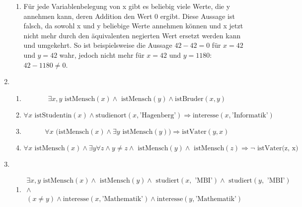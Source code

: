 \documentclass[a4paper]{article}
\begin{document}
\begin{enumerate}
\begin{enumerate}
			\item
			Für jede Variablenbelegung von x gibt es beliebig viele Werte, die y annehmen kann, deren Addition den Wert 0 ergibt.
			\newline
			Diese Aussage ist falsch, da sowohl x und y beliebige Werte annehmen können und x jetzt nicht mehr durch den äquivalenten negierten Wert ersetzt werden kann und umgekehrt.
			\newline
			So ist beispielsweise die Aussage $42 - 42 = 0$ für $x = 42$ und $y = 42$ wahr, jedoch nicht mehr für $x = 42$ und $y = 1180$: $42 - 1180 \neq 0$.
		\end{enumerate}
		
		\item
		\begin{enumerate}
			\item
			\begin{equation*}
				\exists x, y \text{ istMensch}(x) \land \text{ istMensch}(y) \land \text{istBruder}(x, y)
			\end{equation*}
			
			\item
			\begin{equation*}
				\forall x \text{ istStudentin}(x) \land \text{studienort}(x, \text{'Hagenberg'}) \Rightarrow \text{interesse}(x, \text{'Informatik'})
			\end{equation*}
			
			\item
			\begin{equation*}
				\forall x \text{ (istMensch}(x) \land \exists y \text{ istMensch}(y)) \Rightarrow \text{istVater}(y, x)
			\end{equation*}
			
			\item
			\begin{equation*}
				\forall x \text{ istMensch}(x) \land \exists y \forall z \land y \neq z \land \text{ istMensch}(y) \land \text{ istMensch}(z) \Rightarrow \lnot \text{ istVater(z, x)}
			\end{equation*}
		\end{enumerate}
		
		\item
		\begin{enumerate}
			\item
			\begin{equation*}
				\begin{aligned}
					\exists x, y \text{ istMensch}(x) \land \text{ istMensch}(y) \land \text{ studiert}(x, \text{ 'MBI'}) \land \text{ studiert}(y, \text{ 'MBI'}) \\ \land \\ (x \neq y) \land \text{interesse}(x, \text{'Mathematik'}) \land \text{interesse}(y, \text{'Mathematik'})
				\end{aligned}
			\end{equation*}
			

\end{enumerate}
\end{enumerate}
\end{document}
